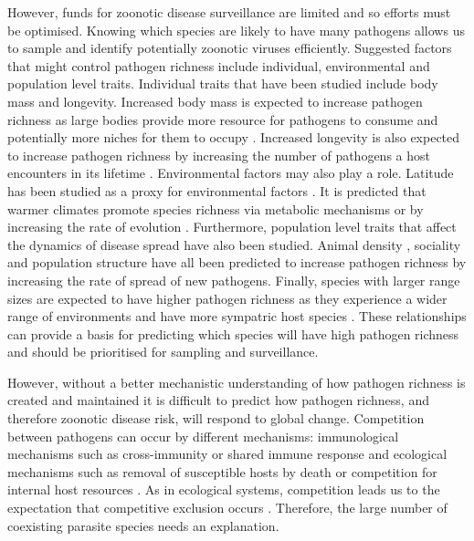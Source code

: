However, funds for zoonotic disease surveillance are limited and so efforts must be optimised.
Knowing which species are likely to have many pathogens allows us to sample and identify potentially zoonotic viruses efficiently.
Suggested factors that might control pathogen richness include individual, environmental and population level traits.
Individual traits that have been studied include body mass and longevity.
Increased body mass is expected to increase pathogen richness as large bodies provide more resource for pathogens to consume and potentially more niches for them to occupy \cite{kamiya2014determines, arneberg2002host, poulin1995phylogeny, gomez2015diversity, bordes2008bat}.
Increased longevity is also expected to increase pathogen richness by increasing the number of pathogens a host encounters in its lifetime \cite{nunn2003comparative, ezenwa2006host, luis2013comparison}. 
Environmental factors may also play a role. 
Latitude has been studied as a proxy for environmental factors \cite{poulin2010latitudinal, kamiya2014determines}.
It is predicted that warmer climates promote species richness via metabolic mechanisms or by increasing the rate of evolution \cite{brown2004toward, dunn2010global, rohde1992latitudinal}.
Furthermore, population level traits that affect the dynamics of disease spread have also been studied.
Animal density \cite{kamiya2014determines, nunn2003comparative, arneberg2002host}, sociality \cite{bordes2007rodent, vitone2004body, altizer2003social, ezenwa2006host} and population structure \cite{nunes2006localized, maganga2014bat, gay2014parasite, turmelle2009correlates} have all been predicted to increase pathogen richness by increasing the rate of spread of new pathogens.
Finally, species with larger range sizes are expected to have higher pathogen richness as they experience a wider range of environments and have more sympatric host species \cite{kamiya2014determines, nunn2003comparative}.
These relationships can provide a basis for predicting which species will have high pathogen richness and should be prioritised for sampling and surveillance.

However, without a better mechanistic understanding of how pathogen richness is created and maintained it is difficult to predict how pathogen richness, and therefore zoonotic disease risk, will respond to global change.
Competition between pathogens can occur by different mechanisms: immunological mechanisms such as cross-immunity or shared immune response \cite{fenton2010applying} and ecological mechanisms such as removal of susceptible hosts by death \cite{rohani2003ecological} or competition for internal host resources \cite{griffiths2014analysis}.
As in ecological systems, competition leads us to the expectation that competitive exclusion occurs \cite{bremermann1989competitive, martcheva2013competitive, ackleh2003competitive, ackleh2014robust, turner2002impact}.
Therefore, the large number of coexisting parasite species needs an explanation.




